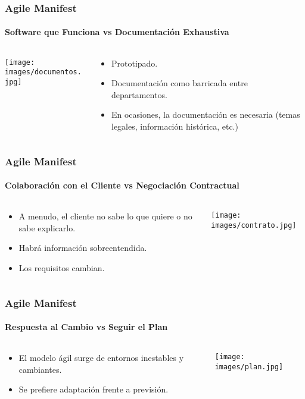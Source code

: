 {  \begin{frame}
   \frametitle{Agile Manifest}
   \framesubtitle{Software que Funciona vs Documentación Exhaustiva}

   \begin{columns}
    \begin{column}{4cm}
     \texttt{[image: images/documentos.jpg]}
    \end{column}
    \begin{column}{7cm}
     \begin{itemize}
      \item<1-> Prototipado.
      \item<2-> Documentación como barricada entre departamentos.
      \item<3-> En ocasiones, la documentación es necesaria (temas legales, información histórica, etc.)
     \end{itemize}
    \end{column}
   \end{columns}
  \end{frame}

  \begin{frame}
   \frametitle{Agile Manifest}
   \framesubtitle{Colaboración con el Cliente vs Negociación Contractual}

   \begin{columns}
    \begin{column}{7cm}
     \begin{itemize}
      \item<1-> A menudo, el cliente no sabe lo que quiere o no sabe explicarlo.
      \item<2-> Habrá información sobreentendida.
      \item<3-> Los requisitos cambian.
     \end{itemize}
    \end{column}
    \begin{column}{4cm}
     \texttt{[image: images/contrato.jpg]}
    \end{column}
   \end{columns}
  \end{frame}

  \begin{frame}
   \frametitle{Agile Manifest}
   \framesubtitle{Respuesta al Cambio vs Seguir el Plan}

   \begin{columns}
    \begin{column}{7cm}
     \begin{itemize}
      \item<1-> El modelo ágil surge de entornos inestables y cambiantes.
      \item<2-> Se prefiere adaptación frente a previsión.
     \end{itemize}
    \end{column}
    \begin{column}{4cm}
     \texttt{[image: images/plan.jpg]}
    \end{column}
   \end{columns}


\end{frame}}
